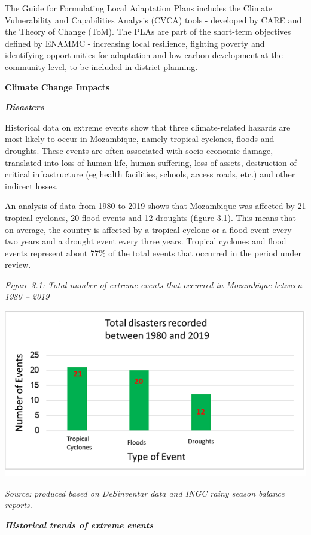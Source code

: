 \documentclass[
]{book}
\begin{document}
The Guide for Formulating Local Adaptation Plans includes the Climate Vulnerability and Capabilities Analysis (CVCA) tools - developed by CARE and the Theory of Change (ToM). The PLAs are part of the short-term objectives defined by ENAMMC - increasing local resilience, fighting poverty and identifying opportunities for adaptation and low-carbon development at the community level, to be included in district planning.

\textbf{Climate Change Impacts}

\textbf{\emph{Disasters}}

Historical data on extreme events show that three climate-related hazards are most likely to occur in Mozambique, namely tropical cyclones, floods and droughts. These events are often associated with socio-economic damage, translated into loss of human life, human suffering, loss of assets, destruction of critical infrastructure (eg health facilities, schools, access roads, etc.) and other indirect losses.

An analysis of data from 1980 to 2019 shows that Mozambique was affected by 21 tropical cyclones, 20 flood events and 12 droughts (figure 3.1). This means that on average, the country is affected by a tropical cyclone or a flood event every two years and a drought event every three years. Tropical cyclones and flood events represent about 77\% of the total events that occurred in the period under review.

\emph{Figure 3.1: Total number of extreme events that occurred in Mozambique between 1980 -- 2019 }

\includegraphics{Disasters.png}

\emph{Source: produced based on DeSinventar data and INGC rainy season balance reports.}

\textbf{\emph{Historical trends of extreme events}}
\end{document}
